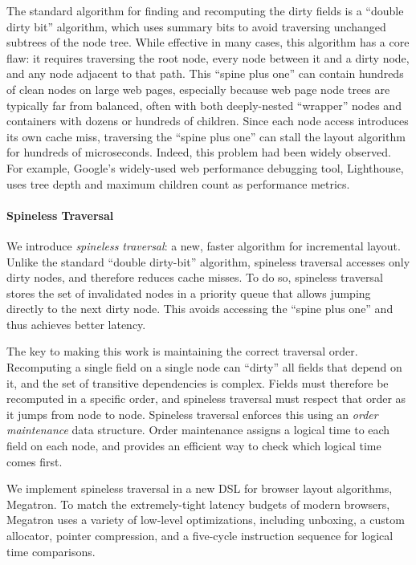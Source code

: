 The standard algorithm for finding and recomputing the dirty fields is a ``double dirty bit'' algorithm, which uses summary bits to avoid traversing unchanged subtrees of the node tree. While effective in many cases, this algorithm has a core flaw: it requires traversing the root node, every node between it and a dirty node, and any node adjacent to that path. This ``spine plus one'' can contain hundreds of clean nodes on large web pages, especially because web page node trees are typically far from balanced, often with both deeply-nested ``wrapper'' nodes and containers with dozens or hundreds of children. Since each node access introduces its own cache miss, traversing the ``spine plus one'' can stall the layout algorithm for hundreds of microseconds. Indeed, this problem had been widely observed. For example, Google's widely-used web performance debugging tool, Lighthouse, uses tree depth and maximum children count as performance metrics.

\paragraph{Spineless Traversal}

We introduce \textit{spineless traversal}: a new, faster algorithm for incremental layout. Unlike the standard ``double dirty-bit'' algorithm, spineless traversal accesses only dirty nodes, and therefore reduces cache misses. To do so, spineless traversal stores the set of invalidated nodes in a priority queue that allows jumping directly to the next dirty node. This avoids accessing the ``spine plus one'' and thus achieves better latency.

The key to making this work is maintaining the correct traversal order. Recomputing a single field on a single node can ``dirty'' all fields that depend on it, and the set of transitive dependencies is complex. Fields must therefore be recomputed in a specific order, and spineless traversal must respect that order as it jumps from node to node. Spineless traversal enforces this using an \emph{order maintenance} data structure. Order maintenance assigns a logical time to each field on each node, and provides an efficient way to check which logical time comes first.

We implement spineless traversal in a new DSL for browser layout algorithms, Megatron. To match the extremely-tight latency budgets of modern browsers, Megatron uses a variety of low-level optimizations, including unboxing, a custom allocator, pointer compression, and a five-cycle instruction sequence for logical time comparisons.

